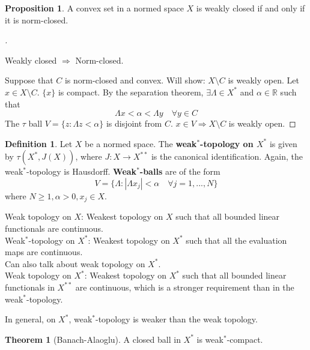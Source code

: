 \documentclass{article}
\theoremstyle{definition}
\newtheorem{thm}{Theorem}
\newtheorem{dfn}{Definition}
\newtheorem{prop}{Proposition}
\newenvironment{proofs}[1][\proofname]{%
  \begin{proof}[#1]$ $\par\nobreak\ignorespaces
}{%
  \end{proof}
}
\newcommand{\RR}{\mathbb R}
\newcommand{\Ra}{\Rightarrow}
\begin{document}
\begin{prop}
	A convex set in a normed space $X$ is weakly closed if and only if it is norm-closed.
\end{prop}

\begin{proofs}
	Weakly closed $\Ra$ Norm-closed.

	\par Suppose that $C$ is norm-closed and convex.
	Will show: $X \setminus C$ is weakly open.
	Let $x \in X \setminus C$.
	$\{x\}$ is compact.
	By the separation theorem, $\exists \Lambda \in X^*$ and $\alpha \in \RR$ such that
	\[
		\Lambda x < \alpha < \Lambda y \quad \forall y \in C
	\]
	The $\tau$ ball $V = \{z: \Lambda z < \alpha\}$ is disjoint from $C$.
	$x \in V \Ra X\setminus C$ is weakly open.
\end{proofs}

\begin{dfn}
	Let $X$ be a normed space.
	The \textbf{weak$^{\bm{*}}$-topology on $X^*$} is given by $\tau(X^*, J(X))$, where $J: X \to X^{**}$ is the canonical identification.
	Again, the weak$^*$-topology is Hausdorff.
	\textbf{Weak$^{\bm{*}}$-balls} are of the form
	\[
		V = \{\Lambda: |\Lambda x_j| < \alpha \quad \forall j = 1, ..., N\}
	\]
	where $N \geq 1, \alpha > 0, x_j \in X$.
\end{dfn}

\noindent Weak topology on $X$: Weakest topology on $X$ such that all bounded linear functionals are continuous.\\
Weak$^*$-topology on $X^*$: Weakest topology on $X^*$ such that all the evaluation maps are continuous.\\
Can also talk about weak topology on $X^*$.\\
Weak topology on $X^*$: Weakest topology on $X^*$ such that all bounded linear functionals in $X^{**}$ are continuous, which is a stronger requirement than in the weak$^*$-topology.

\par In general, on $X^*$, weak$^*$-topology is weaker than the weak topology.

\begin{thm}[Banach-Alaoglu]
	A closed ball in $X^*$ is weak$^*$-compact.
\end{thm}
\end{document}
